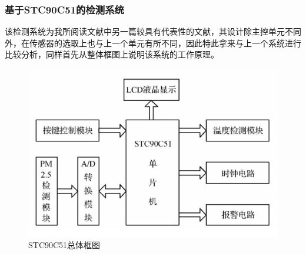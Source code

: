 \documentclass[a4paper, 11pt]{article} %
\begin{document}
\subsubsection{基于STC90C51的检测系统}
\par{} 该检测系统为我所阅读文献中另一篇较具有代表性的文献，其设计除主控单元不同外，在传感器的选取上也与上一个单元有所不同，因此特此拿来与上一个系统进行比较分析，同样首先从整体框图上说明该系统的工作原理。
\begin{figure}[H]
  \centering
  \includegraphics[scale = 0.65 ]{1-4.png}
  \caption{STC90C51总体框图}
  \label{img4} 
\end{figure}
\end{document}
